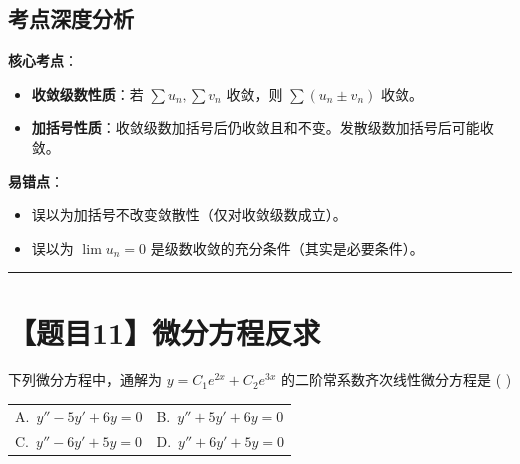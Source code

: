 \documentclass[UTF8,10pt]{ctexart}
\makeatletter
\newenvironment{redenv}{\color{red}}{}
\newenvironment{conceptbox}{%
    \begin{tcolorbox}[colback=red!5, colframe=red!50!black, title=概念解析, fonttitle=\bfseries, top=2pt, bottom=2pt, left=2pt, right=2pt]
}{%
    \end{tcolorbox}
}
\newcommand{\problemrule}{\par\filbreak\noindent\rule{\textwidth}{1.5pt}\vspace{-0.5em}}
\newcommand{\twochoices}[4]{
    \par\noindent
    \begin{tabular*}{\linewidth}{@{\extracolsep{\fill}}ll}
        A.~#1 & B.~#2 \\
        C.~#3 & D.~#4
    \end{tabular*}
}
\makeatother
\begin{document}
\begin{redenv}
\subsection*{考点深度分析}
\begin{conceptbox}
\textbf{核心考点}：
\begin{itemize}
    \item \textbf{收敛级数性质}：若 $\sum u_n, \sum v_n$ 收敛，则 $\sum (u_n \pm v_n)$ 收敛。
    \item \textbf{加括号性质}：收敛级数加括号后仍收敛且和不变。发散级数加括号后可能收敛。
\end{itemize}
\textbf{易错点}：
\begin{itemize}
    \item 误以为加括号不改变敛散性（仅对收敛级数成立）。
    \item 误以为 $\lim u_n = 0$ 是级数收敛的充分条件（其实是必要条件）。
\end{itemize}
\end{conceptbox}
\end{redenv}

\problemrule
\section*{【题目11】微分方程反求}
下列微分方程中，通解为 $y = C_1e^{2x} + C_2e^{3x}$ 的二阶常系数齐次线性微分方程是 ( \quad )
\twochoices{$y'' - 5y' + 6y = 0$}{$y'' + 5y' + 6y = 0$}{$y'' - 6y' + 5y = 0$}{$y'' + 6y' + 5y = 0$}
\end{document}
